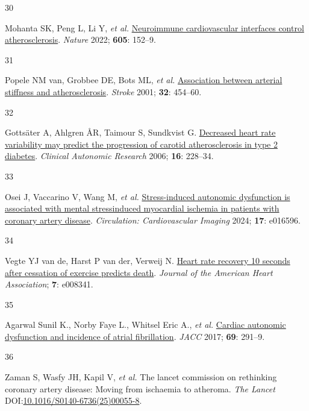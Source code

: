 \documentclass[
  a4paper,
  headsepline=true,
  open=any]{scrbook}
\newlength{\cslhangindent}
\newlength{\csllabelwidth}
\newlength{\cslentryspacingunit} %
\newenvironment{CSLReferences}[2] %
 {%
  \setlength{\parindent}{0pt}
  \ifodd #1
  \let\oldpar\par
  \def\par{\hangindent=\cslhangindent\oldpar}
  \fi
  \setlength{\parskip}{#2\cslentryspacingunit}
 }%
 {}
\newcommand{\CSLLeftMargin}[1]{\parbox[t]{\csllabelwidth}{#1}}
\newcommand{\CSLRightInline}[1]{\parbox[t]{\linewidth - \csllabelwidth}{#1}\break}
\begin{document}
\begin{CSLReferences}{0}{0}
\leavevmode{}%
\CSLLeftMargin{30 }%
\CSLRightInline{Mohanta SK, Peng L, Li Y, \emph{et al.}
\href{https://doi.org/10.1038/s41586-022-04673-6}{Neuroimmune
cardiovascular interfaces control atherosclerosis}. \emph{Nature} 2022;
\textbf{605}: 152--9.}

\leavevmode{}%
\CSLLeftMargin{31 }%
\CSLRightInline{Popele NM van, Grobbee DE, Bots ML, \emph{et al.}
\href{https://doi.org/10.1161/01.STR.32.2.454}{Association between
arterial stiffness and atherosclerosis}. \emph{Stroke} 2001;
\textbf{32}: 454--60.}

\leavevmode{}%
\CSLLeftMargin{32 }%
\CSLRightInline{Gottsäter A, Ahlgren ÅR, Taimour S, Sundkvist G.
\href{https://doi.org/10.1007/s10286-006-0345-4}{Decreased heart rate
variability may predict the progression of carotid atherosclerosis in
type 2 diabetes}. \emph{Clinical Autonomic Research} 2006; \textbf{16}:
228--34.}

\leavevmode{}%
\CSLLeftMargin{33 }%
\CSLRightInline{Osei J, Vaccarino V, Wang M, \emph{et al.}
\href{https://doi.org/10.1161/CIRCIMAGING.124.016596}{Stress-induced
autonomic dysfunction is associated with mental
stress{\textendash}induced myocardial ischemia in patients with coronary
artery disease}. \emph{Circulation: Cardiovascular Imaging} 2024;
\textbf{17}: e016596.}

\leavevmode{}%
\CSLLeftMargin{34 }%
\CSLRightInline{Vegte YJ van de, Harst P van der, Verweij N.
\href{https://doi.org/10.1161/JAHA.117.008341}{Heart rate recovery 10
seconds after cessation of exercise predicts death}. \emph{Journal of
the American Heart Association}; \textbf{7}: e008341.}

\leavevmode{}%
\CSLLeftMargin{35 }%
\CSLRightInline{Agarwal Sunil K., Norby Faye L., Whitsel Eric A.,
\emph{et al.} \href{https://doi.org/10.1016/j.jacc.2016.10.059}{Cardiac
autonomic dysfunction and incidence of atrial fibrillation}. \emph{JACC}
2017; \textbf{69}: 291--9.}

\leavevmode{}%
\CSLLeftMargin{36 }%
\CSLRightInline{Zaman S, Wasfy JH, Kapil V, \emph{et al.} The lancet
commission on rethinking coronary artery disease: Moving from ischaemia
to atheroma. \emph{The Lancet}
DOI:\href{https://doi.org/10.1016/S0140-6736(25)00055-8}{10.1016/S0140-6736(25)00055-8}.}


\end{CSLReferences}
\end{document}
